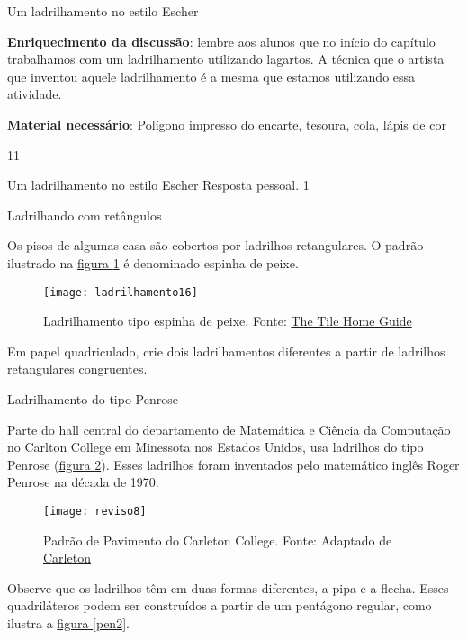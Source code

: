 {\begin{sugestions}{Um ladrilhamento no estilo Escher}
{	\textbf{Enriquecimento da discussão}: lembre aos alunos que no início do capítulo trabalhamos com um ladrilhamento utilizando lagartos. A técnica que o artista que inventou aquele ladrilhamento é a mesma que estamos utilizando essa atividade. 

	\textbf{Material necessário}: Polígono impresso do encarte, tesoura, cola, lápis de cor
}{1}{1}
\end{sugestions}
\begin{answer}{Um ladrilhamento no estilo Escher}
{
	Resposta pessoal.
}{1}
\end{answer}





\begin{task}{Ladrilhando com retângulos} \label{at_outros1}

Os pisos de algumas casa são cobertos por ladrilhos retangulares. O padrão ilustrado na \hyperref[peixe]{figura \ref{peixe}} é denominado espinha de peixe. 

	\begin{figure}[H]
	\centering
	\texttt{[image: ladrilhamento16]}
	\caption{Ladrilhamento tipo espinha de peixe. Fonte: \href{http://www.tilehomeguide.com/tile-patterns-the-ultimate-quick-read-beginners-guide-including-secrets-of-tile-professionals-revealed/}{The Tile Home Guide}}
	\label{peixe}
	\end{figure}

 Em papel quadriculado, crie dois ladrilhamentos  diferentes a partir de ladrilhos retangulares congruentes.

\end{task}
\clearpage
\begin{task}{Ladrilhamento do tipo Penrose}\label{at_outros2}

Parte do hall central do departamento de Matemática e Ciência da Computação no Carlton College em Minessota nos Estados Unidos, usa ladrilhos do tipo Penrose (\hyperref[pen1]{figura \ref{pen1}}). Esses ladrilhos foram inventados pelo matemático inglês Roger Penrose na década de 1970.

\begin{figure}[H]
	\centering
	\texttt{[image: reviso8]}
	\caption{Padrão de Pavimento do Carleton College. Fonte: Adaptado de  \href{https://www.math.carleton.edu/penrose/index.html} {Carleton} }
	\label{pen1}
\end{figure}

Observe que os ladrilhos têm em duas formas diferentes, a pipa e a flecha. Esses quadriláteros podem ser construídos a partir de um pentágono regular, como ilustra a \hyperref[pen2]{figura \ref{pen2}}.


\end{task}}

